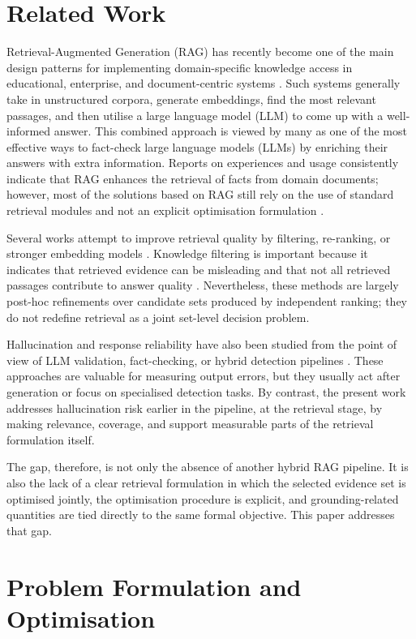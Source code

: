 \documentclass[conference]{IEEEtran}
\begin{document}
\section{Related Work}

Retrieval-Augmented Generation (RAG) has recently become one of the main design patterns for implementing domain-specific knowledge access in educational, enterprise, and document-centric systems \cite{2,7}. Such systems generally take in unstructured corpora, generate embeddings, find the most relevant passages, and then utilise a large language model (LLM) to come up with a well-informed answer. This combined approach is viewed by many as one of the most effective ways to fact-check large language models (LLMs) by enriching their answers with extra information. Reports on experiences and usage consistently indicate that RAG enhances the retrieval of facts from domain documents; however, most of the solutions based on RAG still rely on the use of standard retrieval modules and not an explicit optimisation formulation \cite{4,7}.

Several works attempt to improve retrieval quality by filtering, re-ranking, or stronger embedding models \cite{1,5,6}. Knowledge filtering is important because it indicates that retrieved evidence can be misleading and that not all retrieved passages contribute to answer quality \cite{1}. Nevertheless, these methods are largely post-hoc refinements over candidate sets produced by independent ranking; they do not redefine retrieval as a joint set-level decision problem.

Hallucination and response reliability have also been studied from the point of view of LLM validation, fact-checking, or hybrid detection pipelines \cite{8,9}. These approaches are valuable for measuring output errors, but they usually act after generation or focus on specialised detection tasks. By contrast, the present work addresses hallucination risk earlier in the pipeline, at the retrieval stage, by making relevance, coverage, and support measurable parts of the retrieval formulation itself.

The gap, therefore, is not only the absence of another hybrid RAG pipeline. It is also the lack of a clear retrieval formulation in which the selected evidence set is optimised jointly, the optimisation procedure is explicit, and grounding-related quantities are tied directly to the same formal objective. This paper addresses that gap.

\section{Problem Formulation and Optimisation}
\end{document}
